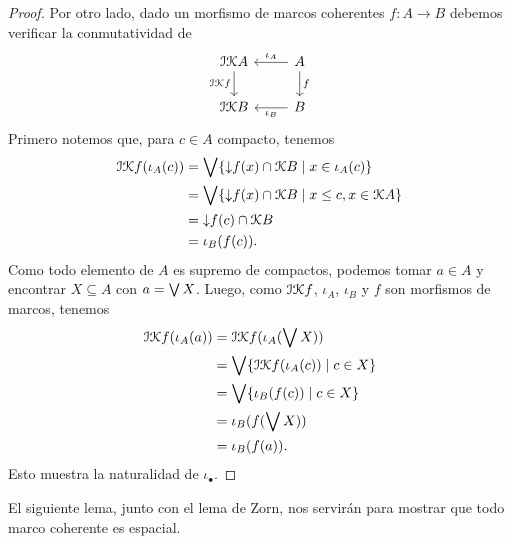 \begin{proof}
    Por otro lado, dado un morfismo de marcos coherentes
    $f:A\to B$ debemos verificar la conmutatividad de
    \[
        \begin{tikzcd}
            \cal I\cal KA
                \ar[d,"\cal I\cal Kf"']
            & A \ar[d,"f"]
                \ar[l,"\iota_A"'] \\
            \cal I\cal KB & B \ar[l,"\iota_B"] 
        \end{tikzcd}
    \]
    Primero notemos que, para $c\in A$ compacto, tenemos
    \begin{align*}
        \cal I\cal Kf(\iota_A(c))
        &= \Sup\{\down f(x)\cap\cal KB\mid x\in\iota_A(c)\} \\
        &= \Sup\{\down f(x)\cap\cal KB\mid x\leq c,x\in\cal KA\} \\
        &= \down f(c)\cap\cal KB \\
        &= \iota_B(f(c)).
    \end{align*}
    Como todo elemento de $A$ es supremo de compactos,
    podemos tomar $a\in A$ y encontrar $X\subseteq A$
    con $a=\Sup X$.
    Luego, como $\cal I\cal Kf$, $\iota_A$, $\iota_B$ y $f$
    son morfismos de marcos, tenemos
    \begin{align*}
        \cal I\cal Kf(\iota_A(a))
        &= \cal I\cal Kf(\iota_A(\Sup X)) \\
        &= \Sup\{\cal I\cal Kf(\iota_A(c))\mid c\in X\} \\
        &= \Sup\{\iota_B(f(c))\mid c\in X\} \\
        &= \iota_B(f(\Sup X)) \\
        &= \iota_B(f(a)).
    \end{align*}
    Esto muestra la naturalidad de $\iota_\bullet$.
\end{proof}

El siguiente lema, junto con el lema de Zorn,
nos servirán para mostrar
que todo marco coherente es espacial.

